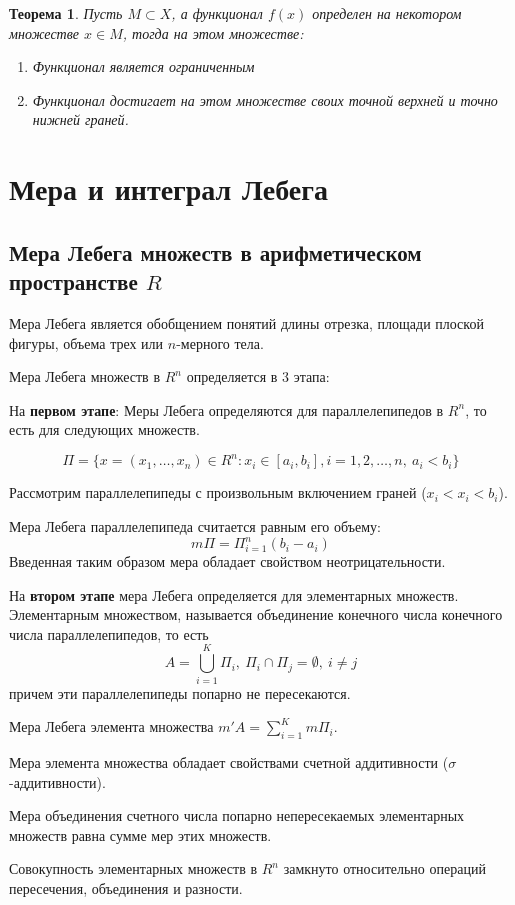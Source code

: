 \documentclass[14pt,a4paper]{extarticle}
\newtheorem{theorem}{Теорема}[section]
\theoremstyle{definition}
\theoremstyle{remark}
\renewcommand{\[}{\begin{dmath*}[compact]}
\renewcommand{\]}{\end{dmath*}}
\newcommand{\be}{\begin{enumerate}}
\newcommand{\ee}{\end{enumerate}}
\newcommand{\sep}{ , \ \allowbreak }
\begin{document}
\begin{theorem}
  Пусть $M\subset X$, а функционал $f(x)$ определен на некотором множестве
  $x \in M$, тогда на этом множестве:
  \be
    \item Функционал является ограниченным
    \item Функционал достигает на этом множестве своих
    точной верхней и точно нижней граней.
  \ee
\end{theorem}

\section{Мера и интеграл Лебега}

\subsection{Мера Лебега множеств в арифметическом пространстве
\texorpdfstring{$R$}{Lg}}

Мера Лебега является обобщением понятий длины отрезка, площади плоской фигуры,
объема трех или $n$-мерного тела.

Мера Лебега множеств в $R^n$ определяется в 3 этапа:

На \textbf{первом этапе}: Меры Лебега определяются для параллелепипедов в $R^n$,
то есть для следующих множеств.

\[\Pi = \{x=(x_1,\dots,x_n)\in R^n: x_i\in [a_i,b_i], i=1,2,\dots,n\sep
a_i<b_i\}\]

Рассмотрим параллелепипеды с произвольным включением граней ($x_i<x_i<b_i$).

Мера Лебега параллелепипеда считается равным его объему:
\[m\Pi = \Pi_{i=1}^n(b_i-a_i)\]
Введенная таким образом мера обладает свойством неотрицательности.

На \textbf{втором этапе} мера Лебега определяется для элементарных множеств.
Элементарным множеством, называется объединение конечного числа конечного
числа параллелепипедов, то есть
\[A=\bigcup _{i=1}^K \Pi_i\sep\Pi_i \cap \Pi_j = \emptyset \sep i\neq j\]
причем эти параллелепипеды попарно не пересекаются.

Мера Лебега элемента множества $m'A=\sum_{i=1}^Km\Pi_i$.

Мера элемента множества обладает свойствами счетной аддитивности
($\sigma$-аддитивности).

Мера объединения счетного числа попарно непересекаемых элементарных множеств
равна сумме мер этих множеств.

Совокупность элементарных множеств в $R^n$ замкнуто относительно операций
пересечения, объединения и разности.
\end{document}

